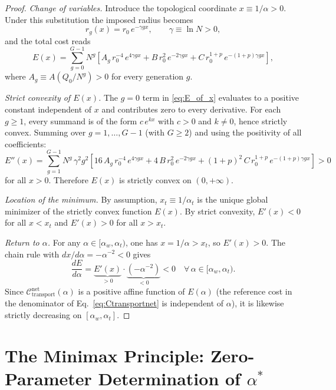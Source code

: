 \documentclass[11pt,a4paper]{article}
\theoremstyle{remark}
\begin{document}
\begin{proof}
\emph{Change of variables.}
Introduce the topological coordinate $x \equiv 1/\alpha > 0$.
Under this substitution the imposed radius becomes
\[
  r_g(x) = r_0\,e^{-\gamma g x}, \qquad \gamma \equiv \ln N > 0,
\]
and the total cost reads
\begin{equation}
  E(x) = \sum_{g=0}^{G-1} N^g\!\left[
      A_g\,r_0^{-4}\,e^{4\gamma g x}
      + B\,r_0^{2}\,e^{-2\gamma g x}
      + C\,r_0^{1+p}\,e^{-(1+p)\gamma g x}
    \right],
  \label{eq:E_of_x}
\end{equation}
where $A_g \equiv A(Q_0/N^g) > 0$ for every generation $g$.

\emph{Strict convexity of $E(x)$.}
The $g=0$ term in \eqref{eq:E_of_x} evaluates to a positive constant independent
of $x$ and contributes zero to every derivative.
For each $g \geq 1$, every summand is of the form $c\,e^{kx}$ with $c > 0$ and
$k \neq 0$, hence strictly convex.
Summing over $g = 1, \ldots, G-1$ (with $G \geq 2$) and using the positivity of
all coefficients:
\[
  E''(x) = \sum_{g=1}^{G-1} N^g\,\gamma^2 g^2\!\left[
      16\,A_g\,r_0^{-4}\,e^{4\gamma g x}
      + 4\,B\,r_0^{2}\,e^{-2\gamma g x}
      + (1+p)^2\,C\,r_0^{1+p}\,e^{-(1+p)\gamma g x}
    \right] > 0
\]
for all $x > 0$. Therefore $E(x)$ is strictly convex on $(0, +\infty)$.

\emph{Location of the minimum.}
By assumption, $x_t \equiv 1/\alpha_t$ is the unique global minimizer of the
strictly convex function $E(x)$.
By strict convexity, $E'(x) < 0$ for all $x < x_t$ and $E'(x) > 0$ for all $x >
x_t$.

\emph{Return to $\alpha$.}
For any $\alpha \in [\alpha_w, \alpha_t)$, one has $x = 1/\alpha > x_t$, so
$E'(x) > 0$.
The chain rule with $dx/d\alpha = -\alpha^{-2} < 0$ gives
\[
  \frac{dE}{d\alpha} = \underbrace{E'(x)}_{>0}
    \cdot \underbrace{\!\left(-\alpha^{-2}\right)}_{<0} < 0
    \quad \forall\,\alpha \in [\alpha_w,\alpha_t).
\]
Since $\mathcal{C}_\mathrm{transport}^\mathrm{net}(\alpha)$ is a positive affine
function of $E(\alpha)$
(the reference cost in the denominator of Eq.~\eqref{eq:Ctransportnet} is
independent of $\alpha$),
it is likewise strictly decreasing on $[\alpha_w, \alpha_t]$.
\end{proof}

\section{The Minimax Principle: Zero-Parameter Determination of $\alpha^*$}
\label{sec:minimax}
\end{document}
